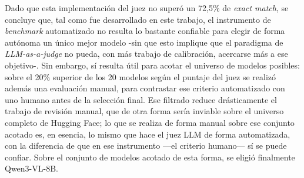 Dado que esta implementación del juez no superó un 72,5\% de \textit{exact match}, se concluye que, tal como fue desarrollado en este trabajo, el instrumento de \textit{benchmark} automatizado no resulta lo bastante confiable para elegir de forma autónoma un único mejor modelo -sin que esto implique que el paradigma de \textit{LLM-as-a-judge} no pueda, con más trabajo de calibración, acercarse más a ese objetivo-. Sin embargo, sí resulta útil para acotar el universo de modelos posibles: sobre el 20\% superior de los 20 modelos según el puntaje del juez se realizó además una evaluación manual, para contrastar ese criterio automatizado con uno humano antes de la selección final. Ese filtrado reduce drásticamente el trabajo de revisión manual, que de otra forma sería inviable sobre el universo completo de Hugging Face; lo que se realiza de forma manual sobre ese conjunto acotado es, en esencia, lo mismo que hace el juez LLM de forma automatizada, con la diferencia de que en ese instrumento —el criterio humano— sí se puede confiar. Sobre el conjunto de modelos acotado de esta forma, se eligió finalmente Qwen3-VL-8B.